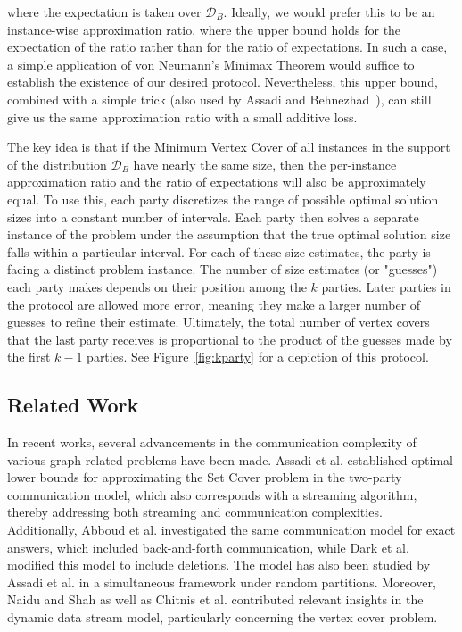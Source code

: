\documentclass[11pt]{article}
\begin{document}
where the expectation is taken over \(\mathcal{D}_B\). Ideally, we would prefer this to be an instance-wise approximation ratio, where the upper bound holds for the expectation of the ratio rather than for the ratio of expectations. In such a case, a simple application of von Neumann's Minimax Theorem would suffice to establish the existence of our desired protocol. Nevertheless, this upper bound, combined with a simple trick (also used by Assadi and Behnezhad~\cite{DBLP:conf/approx/AssadiB21}), can still give us the same approximation ratio with a small additive loss. 



The key idea is that if the Minimum Vertex Cover of all instances in the support of the distribution $\mathcal{D}_B$
  have nearly the same size, then the per-instance approximation ratio and the ratio of expectations will also be approximately equal.
To use this, each party discretizes the range of possible optimal solution sizes into a constant number of intervals. Each party then solves a separate instance of the problem under the assumption that the true optimal solution size falls within a particular interval. For each of these size estimates, the party is facing a distinct problem instance.
The number of size estimates (or "guesses") each party makes depends on their position among the $k$ parties. Later parties in the protocol are allowed more error, meaning they make a larger number of guesses to refine their estimate.
Ultimately, the total number of vertex covers that the last party receives is proportional to the product of the guesses made by the first $k-1$ parties.
See Figure~\ref{fig:kparty} for a depiction of this protocol.



\subsection{Related Work}



    In recent works, several advancements in the communication complexity of various graph-related problems have been made. Assadi et al. \cite{assadi2016tight} established optimal lower bounds for approximating the Set Cover problem in the two-party communication model, which also corresponds with a streaming algorithm, thereby addressing both streaming and communication complexities. Additionally, Abboud et al. \cite{abboud2021smaller} investigated the same communication model for exact answers, which included back-and-forth communication, while Dark et al. \cite{dark2020optimal} modified this model to include deletions. The model has also been studied by Assadi et al. \cite{assadi2017randomized} in a simultaneous framework under random partitions. Moreover, Naidu and Shah \cite{naidu2022space} as well as Chitnis et al. \cite{chitnis2016kernelization} contributed relevant insights in the dynamic data stream model, particularly concerning the vertex cover problem.
\end{document}
